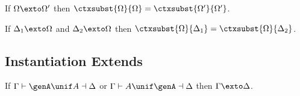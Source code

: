 \begin{mlemma}
  If $\Omega \exto \Omega'$ then $\ctxsubst{\Omega}{\Omega} = \ctxsubst{\Omega'}{\Omega'}$.
  \label{lemma:finish_complete}
\end{mlemma}


\begin{mlemma}
  If $\Delta_1 \exto \Omega$ and $\Delta_2 \exto \Omega$ then
  $\ctxsubst{\Omega}{\Delta_1} = \ctxsubst{\Omega}{\Delta_2}$.
  \label{lemma:confluence}
\end{mlemma}


\subsection{Instantiation Extends}


\begin{mlemma}
  If $\Gamma \vdash \genA \unif A \dashv \Delta$ or $\Gamma \vdash A \unif \genA \dashv \Delta$ then $\Gamma \exto \Delta$.
  \label{lemma:inst_extension}
\end{mlemma}
